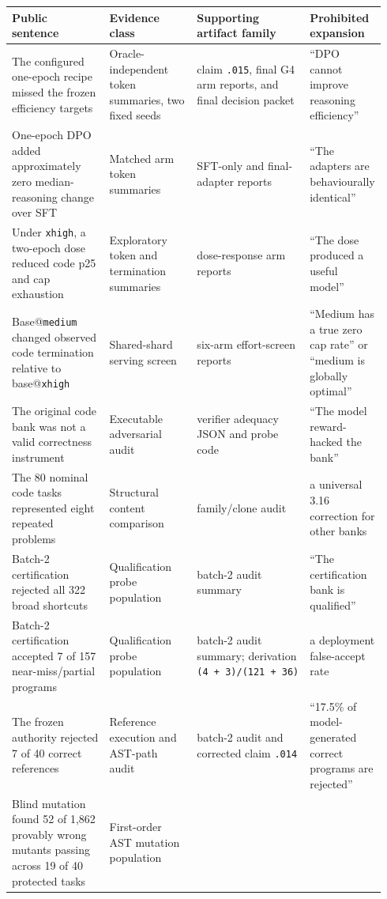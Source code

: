 \documentclass[
]{article}
\newcounter{none} %
\begin{document}
{\def\LTcaptype{none} %
\begin{longtable}[]{@{}p{0.28\linewidth}p{0.25\linewidth}p{0.21\linewidth}p{0.20\linewidth}@{}}
\toprule\noalign{}
Public sentence & Evidence class & Supporting artifact family &
Prohibited expansion \\
\midrule\noalign{}
\endhead
\bottomrule\noalign{}
\endlastfoot
The configured one-epoch recipe missed the frozen efficiency targets &
Oracle-independent token summaries, two fixed seeds & claim
\texttt{.015}, final G4 arm reports, and final decision packet & ``DPO
cannot improve reasoning efficiency'' \\
One-epoch DPO added approximately zero median-reasoning change over SFT
& Matched arm token summaries & SFT-only and final-adapter reports &
``The adapters are behaviourally identical'' \\
Under \texttt{xhigh}, a two-epoch dose reduced code p25 and cap
exhaustion & Exploratory token and termination summaries & dose-response
arm reports & ``The dose produced a useful model'' \\
Base@\texttt{medium} changed observed code termination relative to
base@\texttt{xhigh} & Shared-shard serving screen & six-arm
effort-screen reports & ``Medium has a true zero cap rate'' or ``medium
is globally optimal'' \\
The original code bank was not a valid correctness instrument &
Executable adversarial audit & verifier adequacy JSON and probe code &
``The model reward-hacked the bank'' \\
The 80 nominal code tasks represented eight repeated problems &
Structural content comparison & family/clone audit & a universal 3.16
correction for other banks \\
Batch-2 certification rejected all 322 broad shortcuts & Qualification
probe population & batch-2 audit summary & ``The certification bank is
qualified'' \\
Batch-2 certification accepted 7 of 157 near-miss/partial programs &
Qualification probe population & batch-2 audit summary; derivation
\texttt{(4\ +\ 3)/(121\ +\ 36)} & a deployment false-accept rate \\
The frozen authority rejected 7 of 40 correct references & Reference
execution and AST-path audit & batch-2 audit and corrected claim
\texttt{.014} & ``17.5\% of model-generated correct programs are
rejected'' \\
Blind mutation found 52 of 1,862 provably wrong mutants passing across
19 of 40 protected tasks & First-order AST mutation population &

\end{longtable}}
\end{document}
